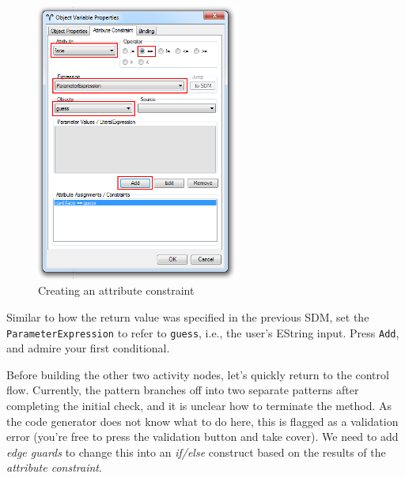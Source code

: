 \begin{stepbystep}
\begin{figure}[htbp]
\begin{center}
  \includegraphics[width=0.6\textwidth]{../../org.moflon.doc.handbook.03_storyDiagrams/04_checkCard/visCheImages/ea_addAttConst}
  \caption{Creating an attribute constraint}
  \label{ea:sdmcheck_att_constraint}
\end{center}
\end{figure}

\item Similar to how the return value was specified in the previous SDM, set the \texttt{ParameterExpression} to refer to \texttt{guess},
i.e., the user's EString input. Press \texttt{Add}, and admire your first conditional.

\end{stepbystep}

Before building the other two activity nodes, let's quickly return to the control flow. Currently, the pattern branches off into two separate patterns after
completing the initial check, and it is unclear how to terminate the method. As the code generator does not know what to do here, this is flagged as a
validation error (you're free to press the validation button and take cover). We
need to add \emph{edge guards} to change this into an \emph{if/else} construct based on the results of the \emph{attribute constraint}.


